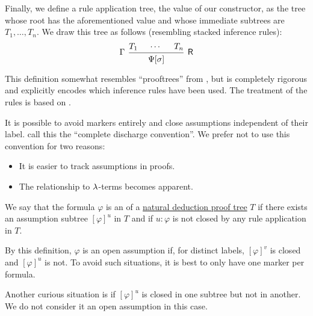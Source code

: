 \begin{definition}
\begin{thmenum}[resume=def:natural_deduction_proof_tree]
    Finally, we define a rule application tree, the value of our constructor, as the tree whose root has the aforementioned value and whose immediate subtrees are \( T_1, \ldots, T_n \). We draw this tree as follows (resembling stacked inference rules):
    \begin{equation*}
      \begin{prooftree}
        \hypo{ T_1 }
        \hypo{ \cdots }
        \hypo{ T_n }
        \infer[left label=\( \Gamma \)]3[\logic{R}]{ \Psi[\sigma] }
      \end{prooftree}
    \end{equation*}
  \end{thmenum}
\end{definition}
\begin{comments}
  \item This definition somewhat resembles \enquote{prooftrees} from , but is completely rigorous and explicitly encodes which inference rules have been used. The treatment of the rules is based on .
  \item It is possible to avoid markers entirely and close assumptions independent of their label.  call this the \enquote{complete discharge convention}. We prefer not to use this convention for two reasons:
  \begin{itemize}
    \item It is easier to track assumptions in proofs.
    \item The relationship to \( \mathrm{\lambda} \)-terms becomes apparent.
  \end{itemize}
\end{comments}

\begin{definition}\label{def:natural_deduction_open_assumptions}\mimprovised
  We say that the formula \( \varphi \) is an  of a \hyperref[def:natural_deduction_proof_tree]{natural deduction proof tree} \( T \) if there exists an assumption subtree \( [\varphi]^u \) in \( T \) and if \( u: \varphi \) is not closed by any rule application in \( T \).
\end{definition}
\begin{comments}
  \item By this definition, \( \varphi \) is an open assumption if, for distinct labels, \( [\varphi]^v \) is closed and \( [\varphi]^u \) is not. To avoid such situations, it is best to only have one marker per formula.
  \item Another curious situation is if \( [\varphi]^u \) is closed in one subtree but not in another. We do not consider it an open assumption in this case.
\end{comments}

